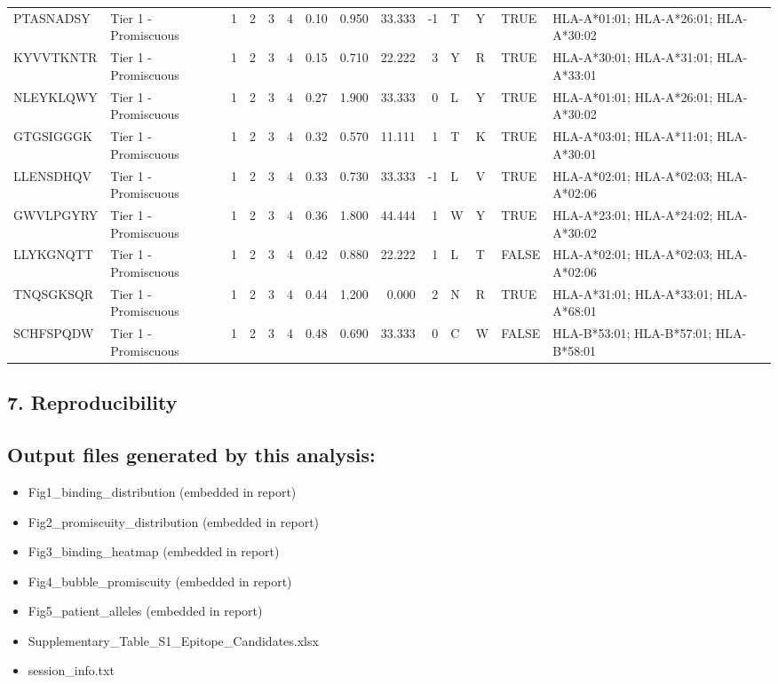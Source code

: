 \documentclass[
]{article}
\providecommand{\tightlist}{%
  \setlength{\itemsep}{0pt}\setlength{\parskip}{0pt}}
\begin{document}
\begin{longtable}[t]{llrrrrrrrrllll}
PTASNADSY & Tier 1 - Promiscuous & 1 & 2 & 3 & 4 & 0.10 & 0.950 & 33.333 & -1 & T & Y & TRUE & HLA-A*01:01; HLA-A*26:01; HLA-A*30:02\\
KYVVTKNTR & Tier 1 - Promiscuous & 1 & 2 & 3 & 4 & 0.15 & 0.710 & 22.222 & 3 & Y & R & TRUE & HLA-A*30:01; HLA-A*31:01; HLA-A*33:01\\
NLEYKLQWY & Tier 1 - Promiscuous & 1 & 2 & 3 & 4 & 0.27 & 1.900 & 33.333 & 0 & L & Y & TRUE & HLA-A*01:01; HLA-A*26:01; HLA-A*30:02\\
GTGSIGGGK & Tier 1 - Promiscuous & 1 & 2 & 3 & 4 & 0.32 & 0.570 & 11.111 & 1 & T & K & TRUE & HLA-A*03:01; HLA-A*11:01; HLA-A*30:01\\
\addlinespace
LLENSDHQV & Tier 1 - Promiscuous & 1 & 2 & 3 & 4 & 0.33 & 0.730 & 33.333 & -1 & L & V & TRUE & HLA-A*02:01; HLA-A*02:03; HLA-A*02:06\\
GWVLPGYRY & Tier 1 - Promiscuous & 1 & 2 & 3 & 4 & 0.36 & 1.800 & 44.444 & 1 & W & Y & TRUE & HLA-A*23:01; HLA-A*24:02; HLA-A*30:02\\
LLYKGNQTT & Tier 1 - Promiscuous & 1 & 2 & 3 & 4 & 0.42 & 0.880 & 22.222 & 1 & L & T & FALSE & HLA-A*02:01; HLA-A*02:03; HLA-A*02:06\\
TNQSGKSQR & Tier 1 - Promiscuous & 1 & 2 & 3 & 4 & 0.44 & 1.200 & 0.000 & 2 & N & R & TRUE & HLA-A*31:01; HLA-A*33:01; HLA-A*68:01\\
SCHFSPQDW & Tier 1 - Promiscuous & 1 & 2 & 3 & 4 & 0.48 & 0.690 & 33.333 & 0 & C & W & FALSE & HLA-B*53:01; HLA-B*57:01; HLA-B*58:01\\
\bottomrule
\end{longtable}

\subsection{7. Reproducibility}\label{reproducibility}

\subsection{Output files generated by this
analysis:}\label{output-files-generated-by-this-analysis}

\begin{itemize}
\tightlist
\item
  Fig1\_binding\_distribution (embedded in report)
\item
  Fig2\_promiscuity\_distribution (embedded in report)
\item
  Fig3\_binding\_heatmap (embedded in report)
\item
  Fig4\_bubble\_promiscuity (embedded in report)
\item
  Fig5\_patient\_alleles (embedded in report)
\item
  Supplementary\_Table\_S1\_Epitope\_Candidates.xlsx
\item
  session\_info.txt
\end{itemize}
\end{document}

